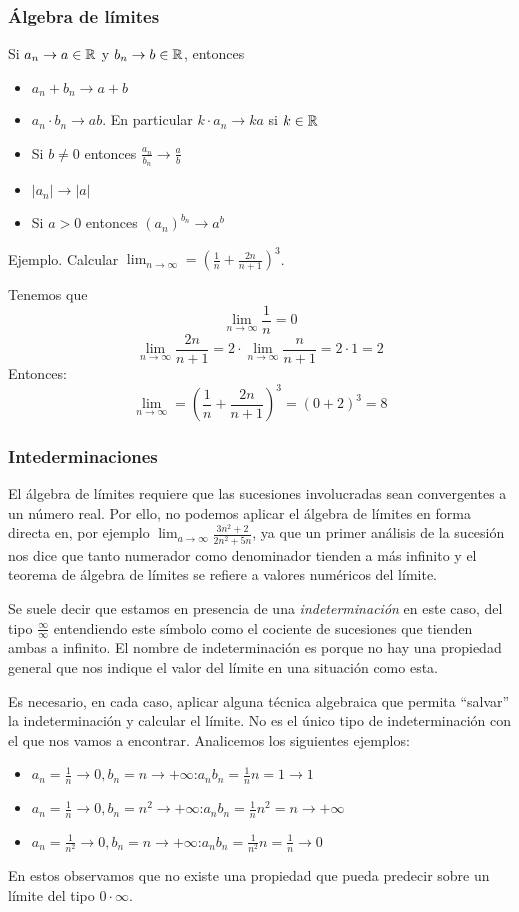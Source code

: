 \documentclass[../teoria.root.tex]{subfiles}
\begin{document}
\subsubsection{Álgebra de límites}
Si \(a_n\rightarrow a\in\mathbb{R}\) y \(b_n\rightarrow b\in\mathbb{R}\), entonces
\begin{itemize}
	\item \(a_n+b_n\rightarrow a+b\)
	\item \(a_n\cdot b_n\rightarrow ab\).
	      En particular \(k\cdot a_n\rightarrow ka\) si \(k\in\mathbb{R}\)
	\item Si \(b\neq0\) entonces \(\frac{a_n}{b_n}\rightarrow\frac{a}{b}\)
	\item \(|a_n|\rightarrow|a|\)
	\item Si \(a>0\) entonces \((a_n)^{b_n}\rightarrow a^b\)
\end{itemize}
Ejemplo.
Calcular \(\lim_{n\to\infty}=\left(\frac{1}{n}+\frac{2n}{n+1}\right)^3\).

Tenemos que \[\lim_{n\to\infty}\frac{1}{n}=0\] \[\lim_{n\to\infty}\frac{2n}{n+1}=2\cdot\lim_{n\to\infty}\frac{n}{n+1}=2\cdot1=2\]
Entonces:
\[\lim_{n\to\infty}=\left(\frac{1}{n}+\frac{2n}{n+1}\right)^3=(0+2)^3=8\]
\subsubsection{Intederminaciones}
El álgebra de límites requiere que las sucesiones involucradas sean convergentes a un número real.
Por ello, no podemos aplicar el álgebra de límites en forma directa en, por ejemplo \(\lim_{a\to\infty}\frac{3n^2+2}{2n^2+5n}\), ya que un primer análisis de la sucesión nos dice que tanto numerador como denominador tienden a más infinito y el teorema de álgebra de límites se refiere a valores numéricos del límite.

Se suele decir que estamos en presencia de una \textit{indeterminación} en este caso, del tipo \(\frac{\infty}{\infty}\) entendiendo este símbolo como el cociente de sucesiones que tienden ambas a infinito.
El nombre de indeterminación es porque no hay una propiedad general que nos indique el valor del límite en una situación como esta.

Es necesario, en cada caso, aplicar alguna técnica algebraica que permita “salvar” la indeterminación y calcular el límite.
No es el único tipo de indeterminación con el que nos vamos a encontrar.
Analicemos los siguientes ejemplos:
\begin{itemize}
	\item \(a_n=\frac{1}{n}\rightarrow0,b_n=n\rightarrow+\infty\):\tab\(a_nb_n=\frac{1}{n}n=1\rightarrow1\)
	\item \(a_n=\frac{1}{n}\rightarrow0,b_n=n^2\rightarrow+\infty\):\tab\(a_nb_n=\frac{1}{n}n^2=n\rightarrow+\infty\)
	\item \(a_n=\frac{1}{n^2}\rightarrow0,b_n=n\rightarrow+\infty\):\tab\(a_nb_n=\frac{1}{n^2}n=\frac{1}{n}\rightarrow0\)
\end{itemize}
En estos observamos que no existe una propiedad que pueda predecir sobre un límite del tipo \(0\cdot\infty\).
\end{document}
